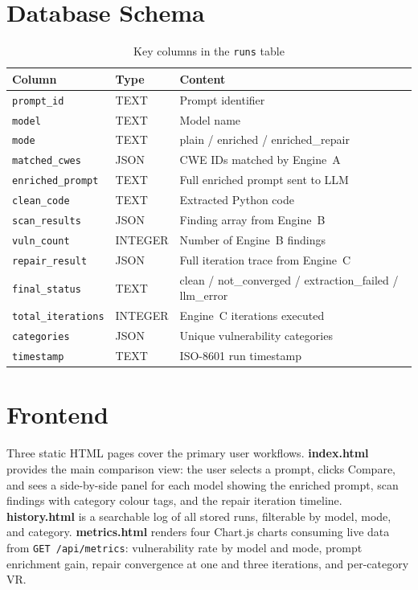 \documentclass[12pt,a4paper]{report}
\begin{document}
\section{Database Schema}
\label{sec:db}

\begin{table}[H]
\centering
\caption{Key columns in the \texttt{runs} table}
\label{tab:schema}
\renewcommand{\arraystretch}{1.3}
\begin{tabularx}{\textwidth}{@{}llX@{}}
\toprule
\textbf{Column} & \textbf{Type} & \textbf{Content} \\
\midrule
\texttt{prompt\_id}        & TEXT    & Prompt identifier \\
\texttt{model}             & TEXT    & Model name \\
\texttt{mode}              & TEXT    & plain / enriched / enriched\_repair \\
\texttt{matched\_cwes}     & JSON    & CWE IDs matched by Engine~A \\
\texttt{enriched\_prompt}  & TEXT    & Full enriched prompt sent to LLM \\
\texttt{clean\_code}       & TEXT    & Extracted Python code \\
\texttt{scan\_results}     & JSON    & Finding array from Engine~B \\
\texttt{vuln\_count}       & INTEGER & Number of Engine~B findings \\
\texttt{repair\_result}    & JSON    & Full iteration trace from Engine~C \\
\texttt{final\_status}     & TEXT    & clean / not\_converged / extraction\_failed / llm\_error \\
\texttt{total\_iterations} & INTEGER & Engine~C iterations executed \\
\texttt{categories}        & JSON    & Unique vulnerability categories \\
\texttt{timestamp}         & TEXT    & ISO-8601 run timestamp \\
\bottomrule
\end{tabularx}
\end{table}

\section{Frontend}
\label{sec:frontend}

Three static HTML pages cover the primary user workflows. \textbf{index.html}
provides the main comparison view: the user selects a prompt, clicks Compare, and
sees a side-by-side panel for each model showing the enriched prompt, scan findings
with category colour tags, and the repair iteration timeline. \textbf{history.html}
is a searchable log of all stored runs, filterable by model, mode, and category.
\textbf{metrics.html} renders four Chart.js charts consuming live data from
\texttt{GET /api/metrics}: vulnerability rate by model and mode, prompt enrichment
gain, repair convergence at one and three iterations, and per-category VR.
\end{document}
